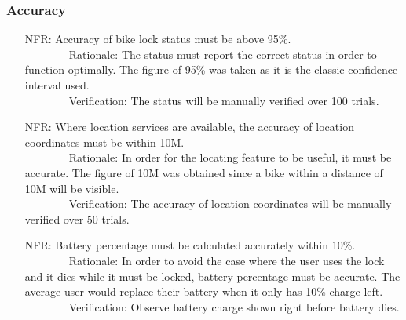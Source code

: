 \documentclass[12pt]{article}
\newcounter{nfrnum} %
\begin{document}
\subsubsection{Accuracy}
\begin{itemize}
\setlength{\itemindent}{.5in}
\item[NFR\refstepcounter{nfrnum}\thenfrnum\label{NFR8}:] Accuracy of bike lock status must be above 95\%.
\\ \-\ \-\ \-\ \-\ \-\ \-\ \-\ \-\ Rationale: The status must report the correct status in order to function optimally. The figure of 95\% was taken as it is the classic confidence interval used. 
\\ \-\ \-\ \-\ \-\ \-\ \-\ \-\ \-\ Verification: The status will be manually verified over 100 trials. 
\item[NFR\refstepcounter{nfrnum}\thenfrnum\label{NFR9}:] Where location services are available, the accuracy of location coordinates must be within 10M.
\\ \-\ \-\ \-\ \-\ \-\ \-\ \-\ \-\ Rationale: In order for the locating feature to be useful, it must be accurate. The figure of 10M was obtained since a bike within a distance of 10M will be visible. 
\\ \-\ \-\ \-\ \-\ \-\ \-\ \-\ \-\ Verification: The accuracy of location coordinates will be manually verified over 50 trials. 
\item[NFR\refstepcounter{nfrnum}\thenfrnum\label{NFR10}:] Battery percentage must be calculated accurately within 10\%.
\\ \-\ \-\ \-\ \-\ \-\ \-\ \-\ \-\ Rationale: In order to avoid the case where the user uses the lock and it dies while it must be locked, battery percentage must be accurate. The average user would replace their battery when it only has 10\% charge left.
\\ \-\ \-\ \-\ \-\ \-\ \-\ \-\ \-\ Verification: Observe battery charge shown right before battery dies. 
\end{itemize}
\end{document}
